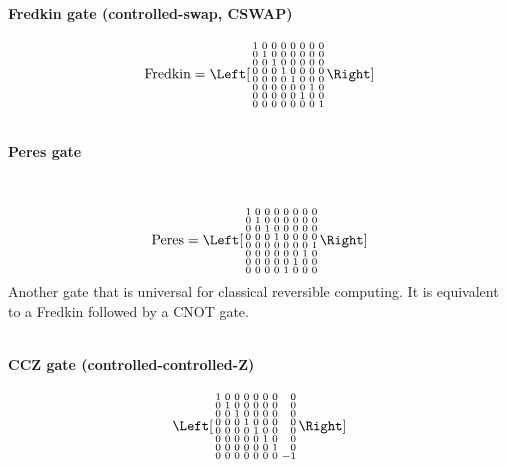 \documentclass[article,pagebackref]{bespoke5}
\begin{document}
\paragraph{Fredkin gate (controlled-swap, CSWAP)}
\[
\text{Fredkin} = 
\Left[ \begin{smallmatrix}
 1 & 0 & 0 & 0 & 0 & 0 & 0 & 0 \\
 0 & 1 & 0 & 0 & 0 & 0 & 0 & 0 \\
 0 & 0 & 1 & 0 & 0 & 0 & 0 & 0 \\
 0 & 0 & 0 & 1 & 0 & 0 & 0 & 0 \\
 0 & 0 & 0 & 0 & 1 & 0 & 0 & 0 \\
 0 & 0 & 0 & 0 & 0 & 0 & 1 & 0 \\
 0 & 0 & 0 & 0 & 0 & 1 & 0 & 0 \\
 0 & 0 & 0 & 0 & 0 & 0 & 0 & 1 \\
\end{smallmatrix} \Right]
\]

$$

$$


\paragraph{Peres gate}~\cite{Peres1985a}
\[
\text{Peres} = 
\Left[ \begin{smallmatrix}
                1& 0& 0& 0& 0& 0& 0& 0 \\
                0& 1& 0& 0& 0& 0& 0& 0 \\
                0& 0& 1& 0& 0& 0& 0& 0 \\
                0& 0& 0& 1& 0& 0& 0& 0 \\
                0& 0& 0& 0& 0& 0& 0& 1 \\
                0& 0& 0& 0& 0& 0& 1& 0 \\
                0& 0& 0& 0& 0& 1& 0& 0 \\
                0& 0& 0& 0& 1& 0& 0& 0 
\end{smallmatrix} \Right]
\]
Another gate that is universal for classical reversible computing. It is equivalent to a Fredkin followed by a CNOT gate.

$$

$$


\paragraph{CCZ gate (controlled-controlled-Z)}
\[
\Left[ \begin{smallmatrix*}[r]
 1 & 0 & 0 & 0 & 0 & 0 & 0 & 0 \\
 0 & 1 & 0 & 0 & 0 & 0 & 0 & 0 \\
 0 & 0 & 1 & 0 & 0 & 0 & 0 & 0 \\
 0 & 0 & 0 & 1 & 0 & 0 & 0 & 0 \\
 0 & 0 & 0 & 0 & 1 & 0 & 0 & 0 \\
 0 & 0 & 0 & 0 & 0 & 1 & 0 & 0 \\
 0 & 0 & 0 & 0 & 0 & 0 & 1 & 0 \\
 0 & 0 & 0 & 0 & 0 & 0 & 0 & -1 \\
\end{smallmatrix*} \Right]
\]
$$

$$
\end{document}
